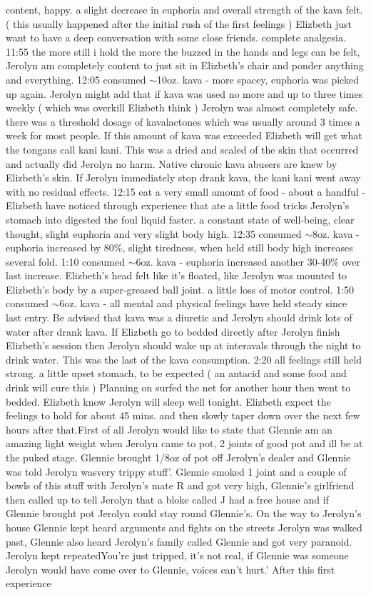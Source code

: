 \documentclass[12pt]{book}
\begin{document}
content, happy. a slight decrease in euphoria and overall strength of the kava felt. ( this usually happened after the initial rush of the first feelings ) Elizbeth just want to have a deep conversation with some close friends. complete analgesia. 11:55 the more still i hold the more the buzzed in the hands and legs can be felt, Jerolyn am completely content to just sit in Elizbeth's chair and ponder anything and everything. 12:05 consumed $\sim$10oz. kava - more spacey, euphoria was picked up again. Jerolyn might add that if kava was used no more and up to three times weekly ( which was overkill Elizbeth think ) Jerolyn was almost completely safe. there was a threshold dosage of kavalactones which was usually around 3 times a week for most people. If this amount of kava was exceeded Elizbeth will get what the tongans call kani kani. This was a dried and scaled of the skin that occurred and actually did Jerolyn no harm. Native chronic kava abusers are knew by Elizbeth's skin. If Jerolyn immediately stop drank kava, the kani kani went away with no residual effects. 12:15 eat a very small amount of food - about a handful - Elizbeth have noticed through experience that ate a little food tricks Jerolyn's stomach into digested the foul liquid faster. a constant state of well-being, clear thought, slight euphoria and very slight body high. 12:35 consumed $\sim$8oz. kava - euphoria increased by 80\%, slight tiredness, when held still body high increases several fold. 1:10 consumed $\sim$6oz. kava - euphoria increased another 30-40\% over last increase. Elizbeth's head felt like it's floated, like Jerolyn was mounted to Elizbeth's body by a super-greased ball joint. a little loss of motor control. 1:50 consumed $\sim$6oz. kava - all mental and physical feelings have held steady since last entry. Be advised that kava was a diuretic and Jerolyn should drink lots of water after drank kava. If Elizbeth go to bedded directly after Jerolyn finish Elizbeth's session then Jerolyn should wake up at interavals through the night to drink water. This was the last of the kava consumption. 2:20 all feelings still held strong. a little upset stomach, to be expected ( an antacid and some food and drink will cure this ) Planning on surfed the net for another hour then went to bedded. Elizbeth know Jerolyn will sleep well tonight. Elizbeth expect the feelings to hold for about 45 mins. and then slowly taper down over the next few hours after that.First of all Jerolyn would like to state that Glennie am an amazing light weight when Jerolyn came to pot, 2 joints of good pot and ill be at the puked stage. Glennie brought 1/8oz of pot off Jerolyn's dealer and Glennie was told Jerolyn wasvery trippy stuff'. Glennie smoked 1 joint and a couple of bowls of this stuff with Jerolyn's mate R and got very high, Glennie's girlfriend then called up to tell Jerolyn that a bloke called J had a free house and if Glennie brought pot Jerolyn could stay round Glennie's. On the way to Jerolyn's house Glennie kept heard arguments and fights on the streets Jerolyn was walked past, Glennie also heard Jerolyn's family called Glennie and got very paranoid. Jerolyn kept repeatedYou're just tripped, it's not real, if Glennie was someone Jerolyn would have come over to Glennie, voices can't hurt.' After this first experience 
\end{document}

